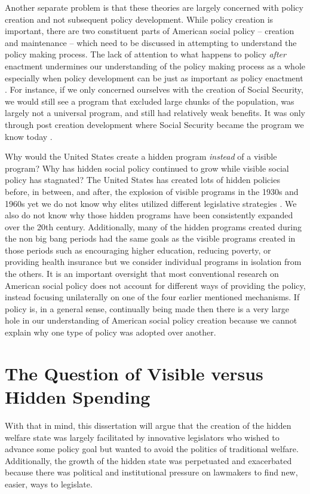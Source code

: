 \documentclass[12pt]{article}
\begin{document}
Another separate problem is that these theories are largely concerned with policy creation and not subsequent policy development. While policy creation is important, there are two constituent parts of American social policy -- creation and maintenance -- which need to be discussed in attempting to understand the policy making process. The lack of attention to what happens to policy \emph{after} enactment undermines our understanding of the policy making process as a whole especially when policy development can be just as important as policy enactment \citep{patashnik2008}. For instance, if we only concerned ourselves with the creation of Social Security, we would still see a program that excluded large chunks of the population, was largely not a universal program, and still had relatively weak benefits. It was only through post creation development where Social Security became the program we know today \citep{derthick1979}.

Why would the United States create a hidden program \emph{instead} of a visible program? Why has hidden social policy continued to grow while visible social policy has stagnated? The United States has created lots of hidden policies before, in between, and after, the explosion of visible programs in the 1930s and 1960s yet we do not know why elites utilized different legislative strategies \citep[Ch. 2]{howard2008}. We also do not know why those hidden programs have been consistently expanded over the 20th century. Additionally, many of the hidden programs created during the non big bang periods had the same goals as the visible programs created in those periods such as encouraging higher education, reducing poverty, or providing health insurance but we consider individual programs in isolation from the others. It is an important oversight that most conventional research on American social policy does not account for different ways of providing the policy, instead focusing unilaterally on one of the four earlier mentioned mechanisms. If policy is, in a general sense, continually being made then there is a very large hole in our understanding of American social policy creation because we cannot explain why one type of policy was adopted over another.

\section{The Question of Visible versus Hidden Spending}
With that in mind, this dissertation will argue that the creation of the hidden welfare state was largely facilitated by innovative legislators who wished to advance some policy goal but wanted to avoid the politics of traditional welfare. Additionally, the growth of the hidden state was perpetuated and exacerbated because there was political and institutional pressure on lawmakers to find new, easier, ways to legislate. 
\end{document}
